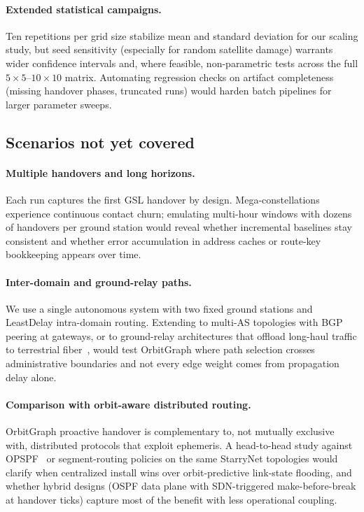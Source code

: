 \paragraph{Extended statistical campaigns.}
Ten repetitions per grid size stabilize mean and standard deviation for our
scaling study, but seed sensitivity (especially for random satellite damage)
warrants wider confidence intervals and, where feasible, non-parametric tests
across the full $5{\times}5$–$10{\times}10$ matrix.
Automating regression checks on artifact completeness (missing handover phases,
truncated runs) would harden batch pipelines for larger parameter sweeps.

\subsection{Scenarios not yet covered}

\paragraph{Multiple handovers and long horizons.}
Each run captures the first GSL handover by design.
Mega-constellations experience continuous contact churn; emulating multi-hour
windows with dozens of handovers per ground station would reveal whether
incremental baselines stay consistent and whether error accumulation in address
caches or route-key bookkeeping appears over time.

\paragraph{Inter-domain and ground-relay paths.}
We use a single autonomous system with two fixed ground stations and
LeastDelay intra-domain routing.
Extending to multi-AS topologies with BGP peering at gateways, or to
ground-relay architectures that offload long-haul traffic to terrestrial
fiber~\cite{handley:ground-relays:2019}, would test OrbitGraph where path
selection crosses administrative boundaries and not every edge weight comes
from propagation delay alone.

\paragraph{Comparison with orbit-aware distributed routing.}
OrbitGraph proactive handover is complementary to, not mutually exclusive with,
distributed protocols that exploit ephemeris.
A head-to-head study against OPSPF~\cite{pam:opspf:2019} or segment-routing
policies on the same StarryNet topologies would clarify when centralized
install wins over orbit-predictive link-state flooding, and whether hybrid
designs (OSPF data plane with SDN-triggered make-before-break at handover
ticks) capture most of the benefit with less operational coupling.

